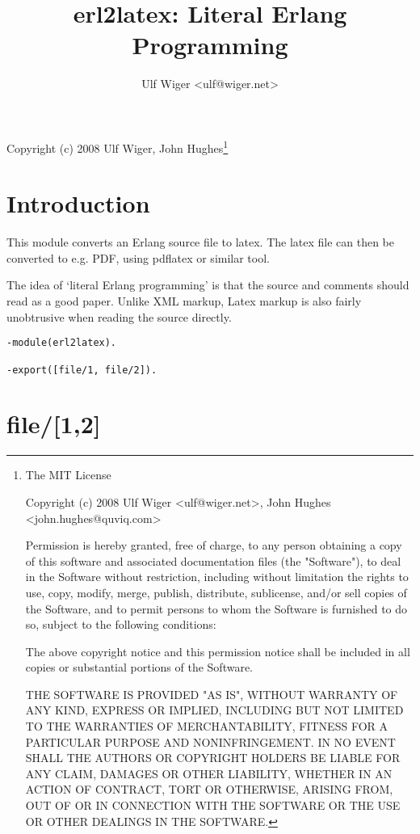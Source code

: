 \documentclass[a4paper,12pt]{article}
\newenvironment{mylisting}
{\begin{list}{}{\setlength{\leftmargin}{1em}}\item\scriptsize\bfseries}
{\end{list}}
\begin{document}
\title{erl2latex: Literal Erlang Programming}
\author{Ulf Wiger <ulf@wiger.net>}
\maketitle

Copyright (c) 2008 Ulf Wiger, John Hughes\footnote{
\tiny{The MIT License

Copyright (c) 2008 Ulf Wiger <ulf@wiger.net>,
John Hughes <john.hughes@quviq.com>

Permission is hereby granted, free of charge, to any person obtaining a
copy of this software and associated documentation files (the "Software"),
to deal in the Software without restriction, including without limitation
the rights to use, copy, modify, merge, publish, distribute, sublicense,
and/or sell copies of the Software, and to permit persons to whom the
Software is furnished to do so, subject to the following conditions:

The above copyright notice and this permission notice shall be included in
all copies or substantial portions of the Software.

THE SOFTWARE IS PROVIDED "AS IS", WITHOUT WARRANTY OF ANY KIND, EXPRESS OR
IMPLIED, INCLUDING BUT NOT LIMITED TO THE WARRANTIES OF MERCHANTABILITY,
FITNESS FOR A PARTICULAR PURPOSE AND NONINFRINGEMENT. IN NO EVENT SHALL
THE AUTHORS OR COPYRIGHT HOLDERS BE LIABLE FOR ANY CLAIM, DAMAGES OR OTHER
LIABILITY, WHETHER IN AN ACTION OF CONTRACT, TORT OR OTHERWISE, ARISING 
FROM, OUT OF OR IN CONNECTION WITH THE SOFTWARE OR THE USE OR OTHER
DEALINGS IN THE SOFTWARE.
}}
\section{Introduction}
This module converts an Erlang source file to latex. The latex file
can then be converted to e.g. PDF, using pdflatex or similar tool.

The idea of `literal Erlang programming' is that the source and comments
should read as a good paper. Unlike XML markup, Latex markup is also 
fairly unobtrusive when reading the source directly.
\begin{mylisting}
\begin{verbatim}
-module(erl2latex).

-export([file/1, file/2]).
\end{verbatim}
\end{mylisting}

\section{file/[1,2]}
\end{document}
